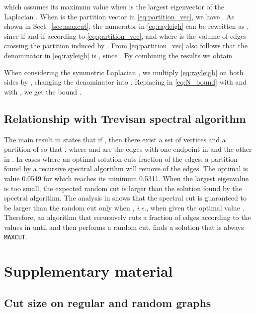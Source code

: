 \documentclass[journal]{IEEEtran}
\newcommand{\maxcut}{\texttt{\small{MAXCUT}}}
\begin{document}
which assumes its maximum value  when  is the largest eigenvector of the Laplacian .
When  is the partition vector in \eqref{eq:partition_vec}, we have .
As shown in Sect.~\ref{sec:maxcut}, the numerator in \eqref{eq:rayleigh} can be rewritten as 
, since  if  and  if  according to \eqref{eq:partition_vec}, and where  is the volume of edges crossing the partition induced by .
From \eqref{eq:partition_vec} also follows that the denominator in \eqref{eq:rayleigh} is , since .
By combining the results we obtain


When considering the symmetric Laplacian , we multiply \eqref{eq:rayleigh} on both sides by , changing the denominator into .
Replacing in \eqref{eq:N_bound}  with  and  with , we get the bound .

\subsection{Relationship with Trevisan \cite{trevisan2012max} spectral algorithm}
\label{sec:trevisan}
The main result in \cite{trevisan2012max} states that if , then there exist a set of vertices  and a partition  of  so that , where  and  are the edges with one endpoint in  and the other in . 
In cases where an optimal solution cuts  fraction of the edges, a partition found by a recursive spectral algorithm will remove  of the edges. 
The optimal  is value 0.0549 for which  reaches its minimum 0.5311. 
When the largest eigenvalue  is too small, the expected random cut is larger than the solution found by the spectral algorithm.
The analysis in \cite{trevisan2012max} shows that the spectral cut is guaranteed to be larger than the random cut only when , \textit{i.e.}, when  given the optimal value .
Therefore, an algorithm that recursively cuts a fraction of edges according to the values in  until  and then performs a random cut, finds a solution that is always  \maxcut{}. 





\clearpage

\onecolumn



\section*{Supplementary material}
\setcounter{subsection}{0}

\subsection{Cut size on regular and random graphs}
\end{document}
